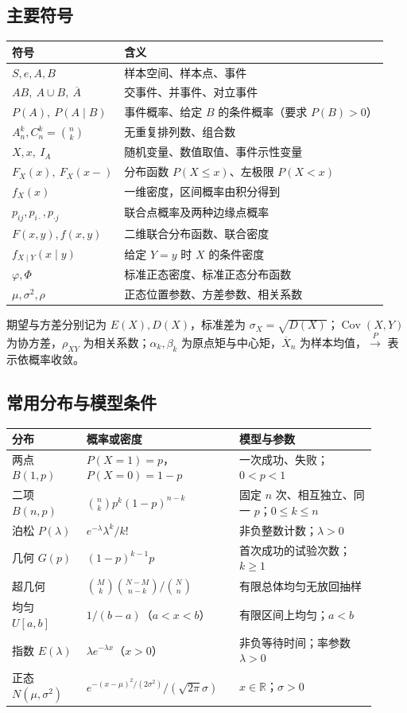 \documentclass[UTF8,fontset=none,zihao=-4,a4paper]{ctexart}
\newcommand{\com}[2]{\binom{#1}{#2}}
\begin{document}
\subsection{主要符号}
\begin{center}\begin{tabularx}{\linewidth}{l Y}\toprule
符号&含义\\\midrule
$S,e,A,B$&样本空间、样本点、事件\\
$AB,\ A\cup B,\ \overline A$&交事件、并事件、对立事件\\
$P(A),\ P(A\mid B)$&事件概率、给定 $B$ 的条件概率（要求 $P(B)>0$）\\
$A_n^k,C_n^k=\com nk$&无重复排列数、组合数\\
$X,x,\ I_A$&随机变量、数值取值、事件示性变量\\
$F_X(x),\ F_X(x-)$&分布函数 $P(X\le x)$、左极限 $P(X<x)$\\
$f_X(x)$&一维密度，区间概率由积分得到\\
$p_{ij},p_{i\cdot},p_{\cdot j}$&联合点概率及两种边缘点概率\\
$F(x,y),f(x,y)$&二维联合分布函数、联合密度\\
$f_{X\mid Y}(x\mid y)$&给定 $Y=y$ 时 $X$ 的条件密度\\
$\varphi,\Phi$&标准正态密度、标准正态分布函数\\
$\mu,\sigma^2,\rho$&正态位置参数、方差参数、相关系数\\\bottomrule
\end{tabularx}\end{center}
期望与方差分别记为 $E(X),D(X)$，标准差为 $\sigma_X=\sqrt{D(X)}$；$\operatorname{Cov}(X,Y)$ 为协方差，$\rho_{XY}$ 为相关系数；$\alpha_k,\beta_k$ 为原点矩与中心矩，$\overline X_n$ 为样本均值，$\xrightarrow{P}$ 表示依概率收敛。
\subsection{常用分布与模型条件}
\begin{longtable}{p{0.19\linewidth}p{0.37\linewidth}p{0.35\linewidth}}
\toprule 分布&概率或密度&模型与参数\\\midrule\endhead
两点 $B(1,p)$&$P(X=1)=p$，$P(X=0)=1-p$&一次成功、失败；$0<p<1$\\
二项 $B(n,p)$&$\com nkp^k(1-p)^{n-k}$&固定 $n$ 次、相互独立、同一 $p$；$0\le k\le n$\\
泊松 $P(\lambda)$&$e^{-\lambda}\lambda^k/k!$&非负整数计数；$\lambda>0$\\
几何 $G(p)$&$(1-p)^{k-1}p$&首次成功的试验次数；$k\ge1$\\
超几何&$\com Mk\com{N-M}{n-k}/\com Nn$&有限总体均匀无放回抽样\\
均匀 $U[a,b]$&$1/(b-a)$（$a<x<b$）&有限区间上均匀；$a<b$\\
指数 $E(\lambda)$&$\lambda e^{-\lambda x}$（$x>0$）&非负等待时间；率参数 $\lambda>0$\\
正态 $N(\mu,\sigma^2)$&$e^{-(x-\mu)^2/(2\sigma^2)}/(\sqrt{2\pi}\sigma)$&$x\in\mathbb R$；$\sigma>0$\\\bottomrule
\end{longtable}
\end{document}
